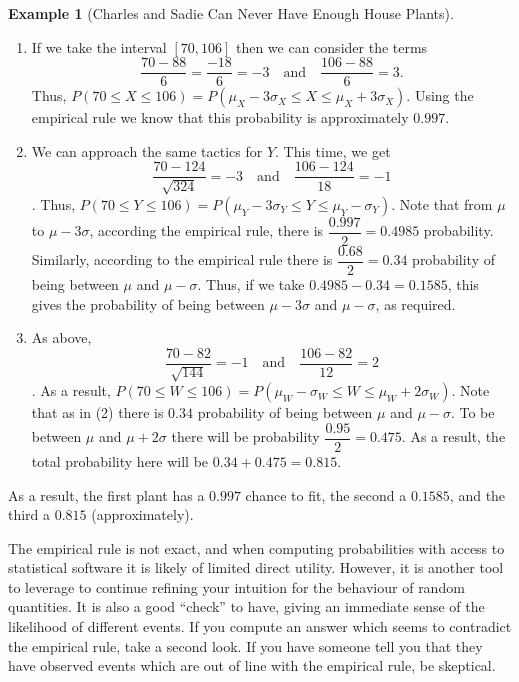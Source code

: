 \documentclass[
  letterpaper,
  DIV=11,
  numbers=noendperiod]{scrreprt}
\providecommand{\tightlist}{%
  \setlength{\itemsep}{0pt}\setlength{\parskip}{0pt}}\usepackage{longtable,booktabs,array}
\theoremstyle{definition}
\theoremstyle{definition}
\newtheorem{example}{Example}[chapter]
\theoremstyle{definition}
\theoremstyle{remark}
\begin{document}
\begin{example}[Charles and Sadie Can Never Have Enough House
Plants]
\begin{tcolorbox}[enhanced jigsaw, colback=white, colframe=quarto-callout-color-frame, arc=.35mm, leftrule=.75mm, rightrule=.15mm, opacityback=0, breakable, bottomrule=.15mm, left=2mm, toprule=.15mm]
\begin{enumerate}
\def\labelenumi{\arabic{enumi}.}
\tightlist
\item
  If we take the interval \([70, 106]\) then we can consider the terms
  \[\frac{70-88}{6} = \frac{-18}{6} = -3 \quad\text{and}\quad \frac{106-88}{6} = 3.\]
  Thus,
  \(P(70 \leq X \leq 106) = P(\mu_X - 3\sigma_X \leq X \leq \mu_X + 3\sigma_X)\).
  Using the empirical rule we know that this probability is
  approximately \(0.997\).
\item
  We can approach the same tactics for \(Y\). This time, we get
  \[\frac{70-124}{\sqrt{324}} = -3 \quad\text{and}\quad \frac{106-124}{18} = -1\].
  Thus,
  \(P(70 \leq Y \leq 106) = P(\mu_Y - 3\sigma_Y \leq Y \leq \mu_Y - \sigma_Y)\).
  Note that from \(\mu\) to \(\mu-3\sigma\), according the empirical
  rule, there is \(\dfrac{0.997}{2} = 0.4985\) probability. Similarly,
  according to the empirical rule there is \(\dfrac{0.68}{2} = 0.34\)
  probability of being between \(\mu\) and \(\mu-\sigma\). Thus, if we
  take \(0.4985 - 0.34 = 0.1585\), this gives the probability of being
  between \(\mu-3\sigma\) and \(\mu-\sigma\), as required.
\item
  As above,
  \[\frac{70-82}{\sqrt{144}} = -1 \quad\text{and}\quad \frac{106-82}{12} = 2\].
  As a result,
  \(P(70 \leq W \leq 106) = P(\mu_W - \sigma_W \leq W \leq \mu_W + 2\sigma_W)\).
  Note that as in (2) there is \(0.34\) probability of being between
  \(\mu\) and \(\mu-\sigma\). To be between \(\mu\) and
  \(\mu + 2\sigma\) there will be probability
  \(\dfrac{0.95}{2} = 0.475\). As a result, the total probability here
  will be \(0.34 + 0.475 = 0.815\).
\end{enumerate}

As a result, the first plant has a \(0.997\) chance to fit, the second a
\(0.1585\), and the third a \(0.815\) (approximately).

\end{tcolorbox}

\end{example}

The empirical rule is not exact, and when computing probabilities with
access to statistical software it is likely of limited direct utility.
However, it is another tool to leverage to continue refining your
intuition for the behaviour of random quantities. It is also a good
``check'' to have, giving an immediate sense of the likelihood of
different events. If you compute an answer which seems to contradict the
empirical rule, take a second look. If you have someone tell you that
they have observed events which are out of line with the empirical rule,
be skeptical.
\end{document}
